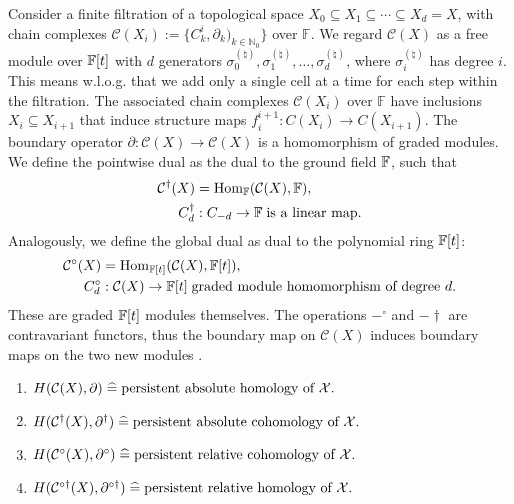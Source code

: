 Consider a finite filtration of a topological space $X_0 \subseteq X_1 \subseteq \cdots \subseteq X_d = X$, with chain complexes \( \mathcal{C}(X_i) := \{C^i_k, \partial_k)_{k \in \mathbb{N}_0} \}\) over \( \mathbb{F} \). We regard $\mathcal{C}(X)$ as a free module over ${\mathbb{F}}[t]$ with $d$ generators $\sigma^{(\natural)}_0, \sigma^{(\natural)}_1, \ldots, \sigma^{(\natural)}_d$, where $\sigma^{(\natural)}_i$ has degree $i$. This means w.l.o.g. that we add only a single cell at a time for each step within the filtration. The associated chain complexes \( \mathcal{C}(X_i) \) over \( \mathbb{F} \) have inclusions \( X_i \subseteq X_{i+1} \) that induce structure maps \( f_{i}^{i+1}: C(X_i) \to C(X_{i+1}) \). The boundary operator $\partial: \mathcal{C}(X) \rightarrow \mathcal{C}(X)$ is a homomorphism of graded modules. We define the pointwise dual as the dual to the ground field ${\mathbb{F}}$, such that
\begin{align}
\mathcal{C}^\dagger(X) &= {\mathrm{Hom}}_{\mathbb{F}}(\mathcal{C}(X),{\mathbb{F}}), \\
C^\dagger_d&: C_{-d} \rightarrow {\mathbb{F}} \; \text{is a linear map.}
\end{align}
Analogously, we define the global dual as dual to the polynomial ring ${\mathbb{F}}[t]$:
\begin{align}
\mathcal{C}^\circ(X) &= {\mathrm{Hom}}_{{\mathbb{F}}[t]}(\mathcal{C}(X),{\mathbb{F}}[t]), \\
C^\circ_d&: \mathcal{C}(X) \rightarrow {\mathbb{F}}[t] \; \text{graded module homomorphism of degree $d$.}
\end{align}
These are graded ${\mathbb{F}}[t]$ modules themselves. The operations $-^\circ$ and $-\dagger$ are contravariant functors, thus the boundary map on $\mathcal{C}(X)$ induces boundary maps on the two new modules \cite[\S 2.8]{de2011dualities}.

\begin{theorem}\noindent
\begin{enumerate}
\item \(H(\mathcal{C}(X), \partial) \; \widehat{=} \; \text{persistent absolute homology\index{homology} of } \mathcal{X}.\)
\item \(H(\mathcal{C}^\dagger(X), \partial^\dagger) \; \widehat{=} \; \text{persistent absolute cohomology\index{cohomology} of } \mathcal{X}.\)
\item \(H(\mathcal{C}^\circ(X), \partial^\circ) \; \widehat{=} \; \text{persistent relative cohomology\index{cohomology} of } \mathcal{X}.\)
\item \(H(\mathcal{C}^{\circ\dagger}(X), \partial^{\circ\dagger}) \; \widehat{=} \; \text{persistent relative homology\index{homology} of } \mathcal{X}.\)
\end{enumerate}
\end{theorem}

